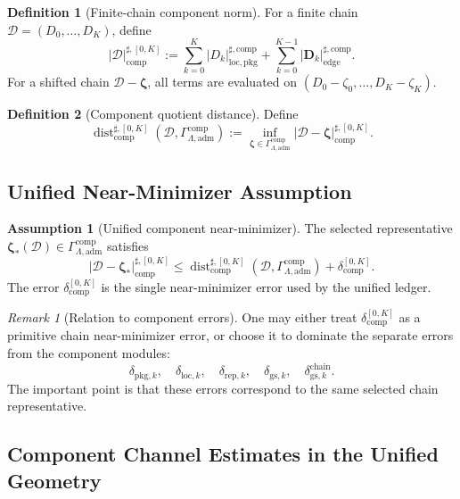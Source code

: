 \documentclass[11pt]{article}
\numberwithin{equation}{section}
\theoremstyle{definition}
\newtheorem{definition}[definition]{Definition}
\newtheorem{assumption}[assumption]{Assumption}
\theoremstyle{remark}
\newtheorem{remark}[remark]{Remark}
\newcommand{\loc}{\mathrm{loc}}
\newcommand{\pkg}{\mathrm{pkg}}
\newcommand{\adm}{\mathrm{adm}}
\newcommand{\rep}{\mathrm{rep}}
\newcommand{\gs}{\mathrm{gs}}
\newcommand{\locerr}{\mathrm{loc}}
\newcommand{\comp}{\mathrm{comp}}
\newcommand{\chain}{\mathrm{chain}}
\newcommand{\Dist}{\operatorname{dist}}
\newcommand{\calD}{\mathcal D}
\newcommand{\bfD}{\mathbf D}
\newcommand{\bzeta}{\boldsymbol\zeta}
\newcommand{\Gcomp}{\Gamma_{\Lambda,\adm}^{\comp}}
\begin{document}
\begin{definition}[Finite-chain component norm]
\label{comp:def:component-norm}
For a finite chain \(\calD=(D_0,\ldots,D_K)\), define
\[
    |\calD|_{\comp}^{\sharp,[0,K]}
    :=
    \sum_{k=0}^{K}
    |D_k|_{\loc,\pkg}^{\sharp,\comp}
    +
    \sum_{k=0}^{K-1}
    |\bfD_k|_{\mathrm{edge}}^{\sharp,\comp}.
\]
For a shifted chain \(\calD-\bzeta\), all terms are evaluated on
\((D_0-\zeta_0,\ldots,D_K-\zeta_K)\).
\end{definition}

\begin{definition}[Component quotient distance]
\label{comp:def:component-distance}
Define
\[
    \Dist_{\comp}^{\sharp,[0,K]}(\calD,\Gcomp)
    :=
    \inf_{\bzeta\in\Gcomp}
    |\calD-\bzeta|_{\comp}^{\sharp,[0,K]}.
\]
\end{definition}

\subsection{Unified Near-Minimizer Assumption}
\label{comp:sec:near-min}

\begin{assumption}[Unified component near-minimizer]
\label{comp:ass:component-near-minimizer}
The selected representative \(\bzeta_*(\calD)\in\Gcomp\) satisfies
\[
    |\calD-\bzeta_*|_{\comp}^{\sharp,[0,K]}
    \le
    \Dist_{\comp}^{\sharp,[0,K]}(\calD,\Gcomp)
    +
    \delta_{\comp}^{[0,K]}.
\]
The error \(\delta_{\comp}^{[0,K]}\) is the single near-minimizer error used by
the unified ledger.
\end{assumption}

\begin{remark}[Relation to component errors]
One may either treat \(\delta_{\comp}^{[0,K]}\) as a primitive chain
near-minimizer error, or choose it to dominate the separate errors from the
component modules:
\[
    \delta_{{\pkg},k},\quad
    \delta_{{\locerr},k},\quad
    \delta_{{\rep},k},\quad
    \delta_{{\gs},k},\quad
    \delta_{{\gs},k}^{\chain}.
\]
The important point is that these errors correspond to the same selected chain
representative.
\end{remark}


\subsection{Component Channel Estimates in the Unified Geometry}
\label{comp:sec:component-channel-estimates}
\end{document}
